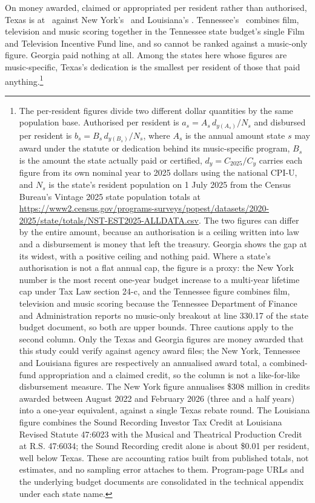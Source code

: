On money awarded, claimed or appropriated per resident rather than authorised,
Texas is at \NMusicDisbursedPercapitaTexas\ against New York's
\NMusicDisbursedPercapitaNewyork\ and Louisiana's
\NMusicDisbursedPercapitaLouisiana. Tennessee's
\NMusicDisbursedPercapitaTennessee\ combines film, television and music
scoring together in the Tennessee state budget's single Film and Television
Incentive Fund line, and so cannot be ranked against a music-only figure.
Georgia paid nothing at all. Among the states here whose figures are
music-specific, Texas's dedication is the smallest per resident of those that
paid anything.\footnote{The per-resident figures divide two different
dollar quantities by the same population base. Authorised per resident is
\(a_s = A_s\,d_{y(A_s)} / N_s\) and disbursed per resident is
\(b_s = B_s\,d_{y(B_s)} / N_s\), where \(A_s\) is the annual amount state
\(s\) may award under the statute or dedication behind its music-specific
program, \(B_s\) is the amount the state actually paid or certified,
\(d_y = C_{2025}/C_y\) carries each figure from its own nominal year to 2025
dollars using the national CPI-U, and \(N_s\) is the state's resident
population on 1 July 2025 from the Census Bureau's Vintage 2025 state
population totals at
\url{https://www2.census.gov/programs-surveys/popest/datasets/2020-2025/state/totals/NST-EST2025-ALLDATA.csv}.
The two figures can differ by the entire amount, because an authorisation is a
ceiling written into law and a disbursement is money that left the treasury.
Georgia shows the gap at its widest, with a positive ceiling and nothing paid.
Where a state's authorisation is not a flat annual cap, the figure is a proxy:
the New York number is the most recent one-year budget increase to a
multi-year lifetime cap under Tax Law section 24-c, and the Tennessee figure
combines film, television and music scoring because the Tennessee Department
of Finance and Administration reports no music-only breakout at line 330.17 of
the state budget document, so both are upper bounds. Three cautions apply to
the second column. Only the Texas and Georgia figures are money awarded that
this study could verify against agency award files; the New York, Tennessee
and Louisiana figures are respectively an annualised award total, a
combined-fund appropriation and a claimed credit, so the column is not a
like-for-like disbursement measure. The New York figure annualises
\$308 million in credits awarded between August 2022 and February 2026 (three
and a half years) into a one-year equivalent, against a single Texas rebate
round. The Louisiana figure combines the Sound Recording Investor Tax Credit
at Louisiana Revised Statute 47:6023 with the Musical and Theatrical
Production Credit at R.S. 47:6034; the Sound Recording credit alone is about
\$0.01 per resident, well below Texas. These are accounting ratios built from
published totals, not estimates, and no sampling error attaches to them.
Program-page URLs and the underlying budget documents are consolidated in the
technical appendix under each state name.}

